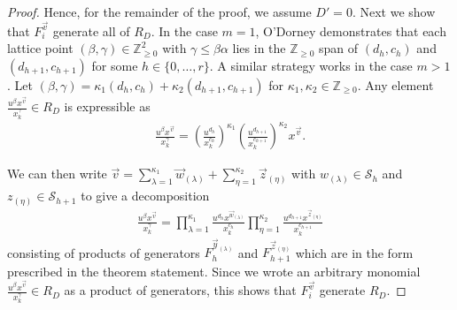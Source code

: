 \documentclass{amsart}
\theoremstyle{plain}
\theoremstyle{definition}
\theoremstyle{remark}
\numberwithin{equation}{subsection}
\newcommand\bn{{\mathbb N}}
\newcommand\bz{{\mathbb Z}}
\newcommand\mss{\mathscr{S}}
\begin{document}
\begin{proof}
Hence, for the remainder of the proof, we assume $D' = 0$.
%
%
Next we show that $F^{\vec v}_i$ generate all of $R_D$. In the case $m = 1$, O'Dorney \cite[Theorem 6]
{dorney:canonical} demonstrates that each lattice point $(\beta, \gamma) \in
\bz_{\geq 0}^2$ with $\gamma \leq \beta \alpha$ lies in the $\bz_{\geq 0}$ span
of $(d_h, c_h)$ and $(d_{h + 1}, c_{h + 1})$ for
some $h \in \{0, \ldots, r\}$. A similar strategy works in the case $m > 1$. Let $(\beta, \gamma) = \kappa_1
(d_h, c_h) + \kappa_2 (d_{h + 1}, c_{h + 1})$ for $\kappa_1, \kappa_2 \in
\bz_{\geq 0}$. Any element $\frac{u^{\beta}
x^{\vec{v}}} {x_k^{ \gamma}} \in R_D$ is expressible as
\begin{align*}
	\frac{u^{\beta} x^{\vec{v}}} {x_k^{\gamma}} = \left(\frac{u^{d_h}}
	{x_k^{c_h}}\right)^{\kappa_1} \left(\frac{u^{d_{h + 1}}}
	{x_k^{c_{h + 1}}}\right)^{\kappa_2} x^{\vec{v}}.
\end{align*}

\noindent
We can then write $\vec{v}  = \sum_{\lambda=1}^{\kappa_1}\vec{w}_{(\lambda)} +
\sum_{\eta=1}^{\kappa_2} \vec z_{(\eta)}$ with $w_{(\lambda)} \in \mss_h$ and
$z_{(\eta)} \in \mss_{h+1}$ to give a decomposition
\begin{align}
\label{eqn:one-point-canonical-form}
	\frac{u^{\beta} x^{\vec{v}}} {x_k^{\gamma}}	= \prod_{\lambda = 1}
	^{\kappa_1} \frac{u^{d_h} x^{\vec{w}_{(\lambda)}}} {x_k^{c_h}}
	\prod_{\eta = 1}^{\kappa_2} \frac{u^{d_{h + 1}} x^{\vec{z}_{(\eta)}}}
	{x_k^{c_{h + 1}}}
\end{align}
\noindent
consisting of products of generators $F_h^{\vec{y}_{(\lambda)}}$
and $F_{h + 1}^{\vec{z}_{(\eta)}}$ which are in the form
prescribed in the theorem statement. Since we wrote an arbitrary monomial
$\frac{u^{\beta} x^{\vec{v}}}{x_k^\gamma} \in R_D$ as a product of generators,
this shows that $F_i^{\vec v}$ generate $R_D$.


\end{proof}
\end{document}
